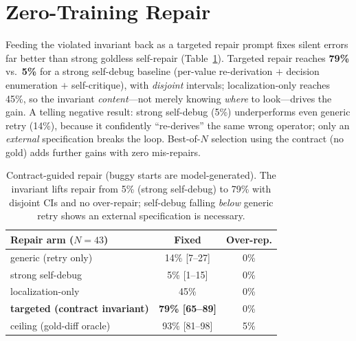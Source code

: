 \documentclass[10pt,twocolumn,letterpaper]{article}
\begin{document}
\section{Zero-Training Repair}\label{sec:repair}
Feeding the violated invariant back as a targeted repair prompt fixes silent
errors far better than strong goldless self-repair (Table~\ref{tab:repair}).
Targeted repair reaches \textbf{79\%} vs.\ \textbf{5\%} for a strong self-debug
baseline (per-value re-derivation $+$ decision enumeration $+$ self-critique),
with \emph{disjoint} intervals; localization-only reaches 45\%, so the invariant
\emph{content}---not merely knowing \emph{where} to look---drives the gain. A
telling negative result: strong self-debug (5\%) underperforms even generic
retry (14\%), because it confidently ``re-derives'' the same wrong operator; only
an \emph{external} specification breaks the loop. Best-of-$N$ selection using the
contract (no gold) adds further gains with zero mis-repairs.

\begin{table}[t]\centering\small
\setlength{\tabcolsep}{4pt}
\begin{tabular}{@{}lcc@{}}
\toprule
Repair arm ($N{=}43$) & Fixed & Over-rep.\\
\midrule
generic (retry only) & 14\% [7--27] & 0\%\\
strong self-debug & 5\% [1--15] & 0\%\\
localization-only & 45\% & 0\%\\
\textbf{targeted (contract invariant)} & \textbf{79\% [65--89]} & 0\%\\
ceiling (gold-diff oracle) & 93\% [81--98] & 5\%\\
\bottomrule
\end{tabular}
\caption{Contract-guided repair (buggy starts are model-generated). The
invariant lifts repair from 5\% (strong self-debug) to 79\% with disjoint CIs
and no over-repair; self-debug falling \emph{below} generic retry shows an
external specification is necessary.}
\label{tab:repair}
\end{table}

\end{document}
